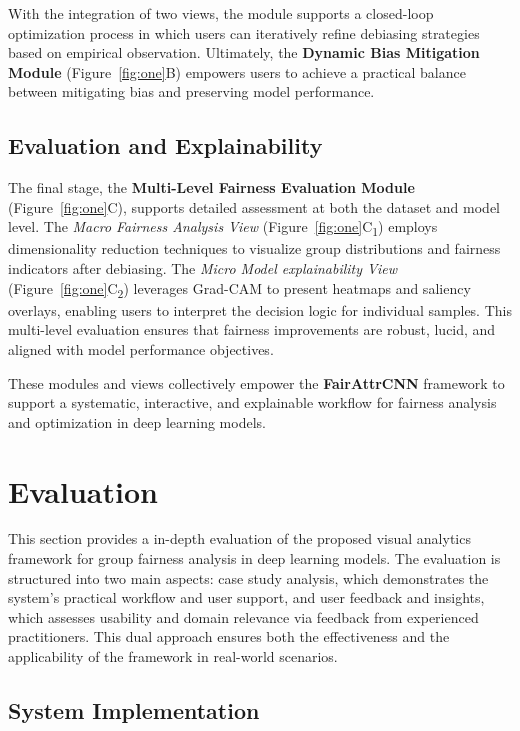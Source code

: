 \documentclass[sigconf]{acmart}
\begin{document}
With the integration of two views, the module supports a closed-loop optimization process in which users can iteratively refine debiasing strategies based on empirical observation. Ultimately, the \textbf{Dynamic Bias Mitigation Module} (Figure~\ref{fig:one}B) empowers users to achieve a practical balance between mitigating bias and preserving model performance.

\subsection{Evaluation and Explainability}

The final stage, the \textbf{Multi-Level Fairness Evaluation Module} (Figure~\ref{fig:one}C), supports detailed assessment at both the dataset and model level. The \textit{Macro Fairness Analysis View} (Figure~\ref{fig:one}C\textsubscript{1}) employs dimensionality reduction techniques to visualize group distributions and fairness indicators after debiasing. The \textit{Micro Model explainability View} (Figure~\ref{fig:one}C\textsubscript{2}) leverages Grad-CAM to present heatmaps and saliency overlays, enabling users to interpret the decision logic for individual samples. This multi-level evaluation ensures that fairness improvements are robust, lucid, and aligned with model performance objectives.



These modules and views collectively empower the \textbf{FairAttrCNN} framework to support a systematic, interactive, and explainable workflow for fairness analysis and optimization in deep learning models.



\section{Evaluation}

This section provides a in-depth evaluation of the proposed visual analytics framework for group fairness analysis in deep learning models. The evaluation is structured into two main aspects: case study analysis, which demonstrates the system's practical workflow and user support, and user feedback and insights, which assesses usability and domain relevance via feedback from experienced practitioners. This dual approach ensures both the effectiveness and the applicability of the framework in real-world scenarios.

\subsection{System Implementation}
\end{document}
